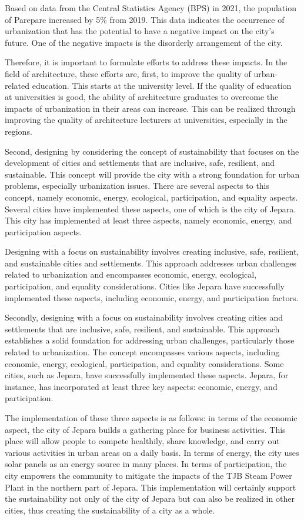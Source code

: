 \documentclass[../main.tex]{subfiles}
\begin{document}
Based on data from the Central Statistics Agency (BPS) in 2021, the population of Parepare increased by 5\% from 2019.
This data indicates the occurrence of urbanization that has the potential to have a negative impact on the city's future. One of the negative impacts is the disorderly arrangement of the city.


Therefore, it is important to formulate efforts to address these impacts.
In the field of architecture, these efforts are, first, to improve the quality of urban-related education. This starts at the university level. If the quality of education at universities is good, the ability of architecture graduates to overcome the impacts of urbanization in their areas can increase. This can be realized through improving the quality of architecture lecturers at universities, especially in the regions.

Second, designing by considering the concept of sustainability that focuses on the development of cities and settlements that are inclusive, safe, resilient, and sustainable. This concept will provide the city with a strong foundation for urban problems, especially urbanization issues.
There are several aspects to this concept, namely economic, energy, ecological, participation, and equality aspects. Several cities have implemented these aspects, one of which is the city of Jepara. This city has implemented at least three aspects, namely economic, energy, and participation aspects.

Designing with a focus on sustainability involves creating inclusive, safe, resilient, and sustainable cities and settlements. This approach addresses urban challenges related to urbanization and encompasses economic, energy, ecological, participation, and equality considerations. Cities like Jepara have successfully implemented these aspects, including economic, energy, and participation factors.

Secondly, designing with a focus on sustainability involves creating cities and settlements that are inclusive, safe, resilient, and sustainable.
This approach establishes a solid foundation for addressing urban challenges, particularly those related to urbanization.
The concept encompasses various aspects, including economic, energy, ecological, participation, and equality considerations.
Some cities, such as Jepara, have successfully implemented these aspects. Jepara, for instance, has incorporated at least three key aspects: economic, energy, and participation.

The implementation of these three aspects is as follows: in terms of the economic aspect, the city of Jepara builds a gathering place for business activities. This place will allow people to compete healthily, share knowledge, and carry out various activities in urban areas on a daily basis. In terms of energy, the city uses solar panels as an energy source in many places. In terms of participation, the city empowers the community to mitigate the impacts of the TJB Steam Power Plant in the northern part of Jepara. This implementation will certainly support the sustainability not only of the city of Jepara but can also be realized in other cities, thus creating the sustainability of a city as a whole.
\end{document}

